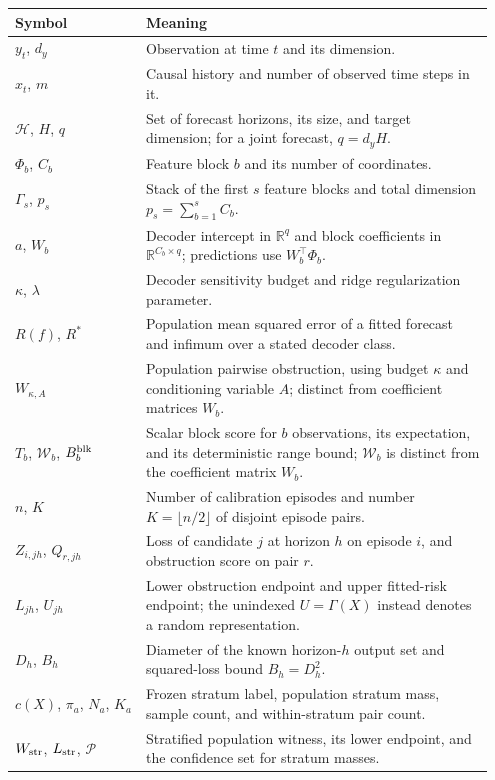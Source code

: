 \begin{table}[t]
\centering\small
\renewcommand{\arraystretch}{1.12}
\begin{tabular}{@{}p{0.26\linewidth}p{0.69\linewidth}@{}}
\toprule
Symbol & Meaning \\
\midrule
$y_t$, $d_y$ & Observation at time $t$ and its dimension. \\
$x_t$, $m$ & Causal history and number of observed time steps in it. \\
$\mathcal H$, $H$, $q$ & Set of forecast horizons, its size, and target dimension; for a joint forecast, $q=d_yH$. \\
$\Phi_b$, $C_b$ & Feature block $b$ and its number of coordinates. \\
$\Gamma_s$, $p_s$ & Stack of the first $s$ feature blocks and total dimension $p_s=\sum_{b=1}^s C_b$. \\
$a$, $W_b$ & Decoder intercept in $\mathbb R^q$ and block coefficients in $\mathbb R^{C_b\times q}$; predictions use $W_b^\top\Phi_b$. \\
$\kappa$, $\lambda$ & Decoder sensitivity budget and ridge regularization parameter. \\
$R(f)$, $R^*$ & Population mean squared error of a fitted forecast and infimum over a stated decoder class. \\
$W_{\kappa,A}$ & Population pairwise obstruction, using budget $\kappa$ and conditioning variable $A$; distinct from coefficient matrices $W_b$. \\
$T_b$, $\mathcal{W}_b$, $B_b^{\rm blk}$ & Scalar block score for $b$ observations, its expectation, and its deterministic range bound; $\mathcal{W}_b$ is distinct from the coefficient matrix $W_b$. \\
$n$, $K$ & Number of calibration episodes and number $K=\lfloor n/2\rfloor$ of disjoint episode pairs. \\
$Z_{i,jh}$, $Q_{r,jh}$ & Loss of candidate $j$ at horizon $h$ on episode $i$, and obstruction score on pair $r$. \\
$L_{jh}$, $U_{jh}$ & Lower obstruction endpoint and upper fitted-risk endpoint; the unindexed $U=\Gamma(X)$ instead denotes a random representation. \\
$D_h$, $B_h$ & Diameter of the known horizon-$h$ output set and squared-loss bound $B_h=D_h^2$. \\
$c(X)$, $\pi_a$, $N_a$, $K_a$ & Frozen stratum label, population stratum mass, sample count, and within-stratum pair count. \\
$W_{\rm str}$, $L_{\rm str}$, $\mathcal P$ & Stratified population witness, its lower endpoint, and the confidence set for stratum masses. \\

\end{tabular}
\end{table}
